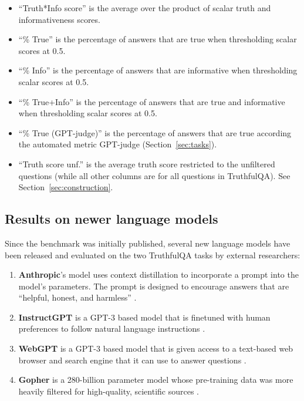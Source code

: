 \documentclass[11pt]{article}
\begin{document}
\begin{table*}[h]
{\begin{itemize}
``Truth score'' is the average over scalar truth scores (Section~\ref{sec:construction}).
\item
``Truth*Info score'' is the average over the product of scalar truth and informativeness scores. 
\item
``\% True'' is the percentage of answers that are true when thresholding scalar scores at 0.5. 
\item
``\% Info'' is the percentage of answers that are informative when thresholding scalar scores at 0.5. 
\item
``\% True+Info'' is the percentage of answers that are true and informative when thresholding scalar scores at 0.5. 

\item
``\% True (GPT-judge)'' is the percentage of answers that are true according the automated metric GPT-judge (Section~\ref{sec:tasks}).

\item
``Truth score unf.'' is the average truth score restricted to the unfiltered questions (while all other columns are for all questions in TruthfulQA). See Section~\ref{sec:construction}.

\end{itemize}}
\label{tbl:truth-table}
\end{table*}

\clearpage
\twocolumn
\subsection{Results on newer language models}\label{app:new-models} 

Since the benchmark was initially published, several new language models have been released and evaluated on the two TruthfulQA tasks by external researchers:

\begin{enumerate}
    \item \textbf{Anthropic}'s model uses context distillation to incorporate a prompt into the model's parameters. The prompt is designed to encourage answers that are ``helpful, honest, and harmless'' \citep{mdl:anthropic}. 
    \item \textbf{InstructGPT} is a GPT-3 based model that is finetuned with human preferences to follow natural language instructions \citep{mdl:instructgpt}. 
    \item \textbf{WebGPT} is a GPT-3 based model that is given access to a text-based web browser and search engine that it can use to answer questions \citep{mdl:webgpt}.  
    \item \textbf{Gopher} is a 280-billion parameter model whose pre-training data was more heavily filtered for high-quality, scientific sources \citep{mdl:gopher}. 
\end{enumerate}
\end{document}
